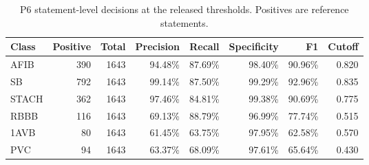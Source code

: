 \begin{table}[tbp]
\caption{P6 statement-level decisions at the released thresholds. Positives are reference statements.\label{tab:rhythmclass}}
\centering\small
\begin{tabular}{lrrrrrrr}
\toprule
Class & Positive & Total & Precision & Recall & Specificity & F1 & Cutoff \\
\midrule
AFIB & 390 & 1643 & 94.48\% & 87.69\% & 98.40\% & 90.96\% & 0.820 \\
SB & 792 & 1643 & 99.14\% & 87.50\% & 99.29\% & 92.96\% & 0.835 \\
STACH & 362 & 1643 & 97.46\% & 84.81\% & 99.38\% & 90.69\% & 0.775 \\
RBBB & 116 & 1643 & 69.13\% & 88.79\% & 96.99\% & 77.74\% & 0.515 \\
1AVB & 80 & 1643 & 61.45\% & 63.75\% & 97.95\% & 62.58\% & 0.570 \\
PVC & 94 & 1643 & 63.37\% & 68.09\% & 97.61\% & 65.64\% & 0.430 \\
\bottomrule
\end{tabular}
\end{table}